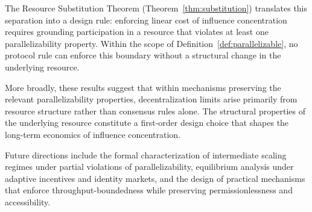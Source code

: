 \documentclass[manuscript,review]{acmart}
\theoremstyle{remark}
\begin{document}
	The Resource Substitution Theorem
	(Theorem~\ref{thm:substitution}) translates this
	separation into a design rule: enforcing linear
	cost of influence concentration requires grounding
	participation in a resource that violates at least
	one parallelizability property.
	Within the scope of Definition~\ref{def:parallelizable},
	no protocol rule can enforce this boundary without a
	structural change in the underlying resource.
	
	More broadly, these results suggest that within
	mechanisms preserving the relevant parallelizability
	properties, decentralization limits arise primarily
	from resource structure rather than consensus rules
	alone.
	The structural properties of the underlying resource
	constitute a first-order design choice that shapes
	the long-term economics of influence concentration.
	
	Future directions include the formal characterization
	of intermediate scaling regimes under partial
	violations of parallelizability, equilibrium analysis
	under adaptive incentives and identity markets, and
	the design of practical mechanisms that enforce
	throughput-boundedness while preserving
	permissionlessness and accessibility.
	
	
	
	
	
\end{document}
